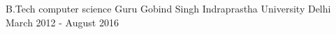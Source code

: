 

\begin{cventries}

  \cventry
    {B.Tech computer science} %
    {Guru Gobind Singh Indraprastha University} %
    {Delhi} %
    {March 2012 - August 2016} %
    {
      \begin{cvitems} %
      \end{cvitems}
    }

\end{cventries}
